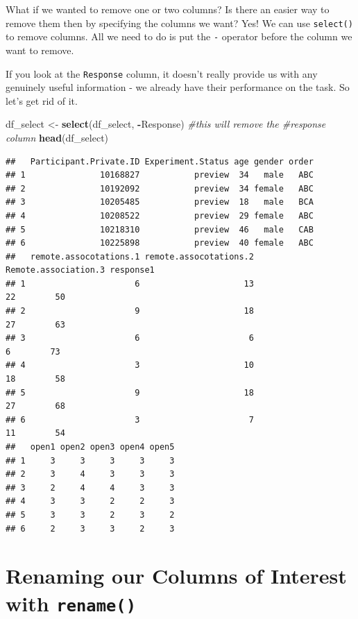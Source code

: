 \documentclass[
]{book}
\newenvironment{Shaded}{\begin{snugshade}}{\end{snugshade}}
\newcommand{\CommentTok}[1]{\textcolor[rgb]{0.56,0.35,0.01}{\textit{#1}}}
\newcommand{\FunctionTok}[1]{\textcolor[rgb]{0.13,0.29,0.53}{\textbf{#1}}}
\newcommand{\NormalTok}[1]{#1}
\newcommand{\OtherTok}[1]{\textcolor[rgb]{0.56,0.35,0.01}{#1}}
\newcommand{\SpecialCharTok}[1]{\textcolor[rgb]{0.81,0.36,0.00}{\textbf{#1}}}
\begin{document}
What if we wanted to remove one or two columns? Is there an easier way to remove them then by specifying the columns we want? Yes! We can use \texttt{select()} to remove columns. All we need to do is put the \texttt{-} operator before the column we want to remove.

If you look at the \texttt{Response} column, it doesn't really provide us with any genuinely useful information - we already have their performance on the task. So let's get rid of it.

\begin{Shaded}
\begin{Highlighting}[]
\NormalTok{df\_select }\OtherTok{\textless{}{-}} \FunctionTok{select}\NormalTok{(df\_select, }\SpecialCharTok{{-}}\NormalTok{Response) }\CommentTok{\#this will remove the \#response column}
\FunctionTok{head}\NormalTok{(df\_select)}
\end{Highlighting}
\end{Shaded}

\begin{verbatim}
##   Participant.Private.ID Experiment.Status age gender order
## 1               10168827           preview  34   male   ABC
## 2               10192092           preview  34 female   ABC
## 3               10205485           preview  18   male   BCA
## 4               10208522           preview  29 female   ABC
## 5               10218310           preview  46   male   CAB
## 6               10225898           preview  40 female   ABC
##   remote.assocotations.1 remote.assocotations.2 Remote.association.3 response1
## 1                      6                     13                   22        50
## 2                      9                     18                   27        63
## 3                      6                      6                    6        73
## 4                      3                     10                   18        58
## 5                      9                     18                   27        68
## 6                      3                      7                   11        54
##   open1 open2 open3 open4 open5
## 1     3     3     3     3     3
## 2     3     4     3     3     3
## 3     2     4     4     3     3
## 4     3     3     2     2     3
## 5     3     3     2     3     2
## 6     2     3     3     2     3
\end{verbatim}

\section{\texorpdfstring{Renaming our Columns of Interest with \texttt{rename()}}{Renaming our Columns of Interest with rename()}}\label{renaming-our-columns-of-interest-with-rename}
\end{document}
